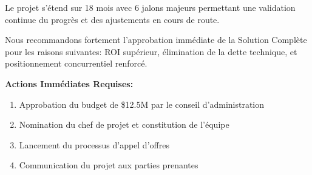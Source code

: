 \documentclass{TemplatesParametriques/dollarama}
\begin{document}
\begin{dollaramatimeline}{
    Le projet s'étend sur 18 mois avec 6 jalons majeurs permettant une validation continue du progrès et des ajustements en cours de route.
}
\end{dollaramatimeline}


\begin{dollaramarecommendations}{
    Nous recommandons fortement l'approbation immédiate de la Solution Complète pour les raisons suivantes: ROI supérieur, élimination de la dette technique, et positionnement concurrentiel renforcé.
}
    
    \textbf{Actions Immédiates Requises:}
    \begin{enumerate}
        \item Approbation du budget de \$12.5M par le conseil d'administration
        \item Nomination du chef de projet et constitution de l'équipe
        \item Lancement du processus d'appel d'offres
        \item Communication du projet aux parties prenantes
    \end{enumerate}
    
\end{dollaramarecommendations}
\end{document}
